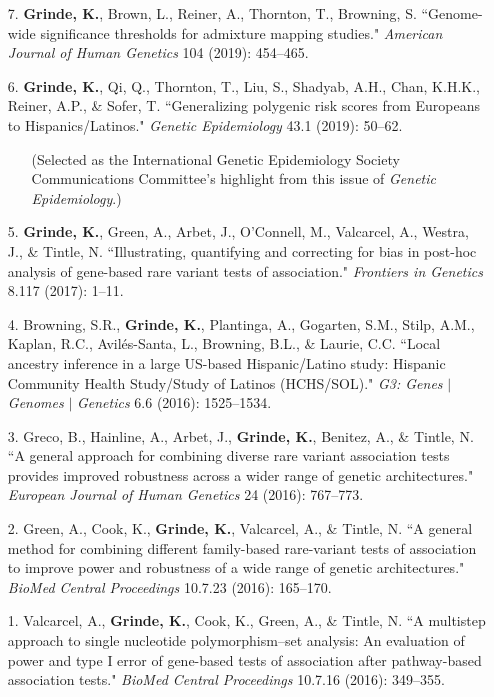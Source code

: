 \documentclass[margin]{res}
\begin{document}
\begin{resume}
\begin{itemize}
\item[7.] \textbf{Grinde, K.}, Brown, L., Reiner, A., Thornton, T., Browning, S. ``Genome-wide significance thresholds for admixture mapping studies." \textit{American Journal of Human Genetics} 104 (2019): 454--465. 

\item[6.] \textbf{Grinde, K.}, Qi, Q., Thornton, T., Liu, S., Shadyab, A.H., Chan, K.H.K., Reiner, A.P., \& Sofer, T. ``Generalizing polygenic risk scores from Europeans to Hispanics/Latinos." \textit{Genetic Epidemiology} 43.1 (2019): 50--62. 
	\begin{itemize} \itemsep -2pt
	\item[] (Selected as the International Genetic Epidemiology Society Communications Committee's highlight from this issue of \textit{Genetic Epidemiology}.)
	\end{itemize}
 
\item[5.] \textbf{Grinde, K.}, Green, A., Arbet, J., O'Connell, M., Valcarcel, A., Westra, J., \& Tintle, N. ``Illustrating, quantifying and correcting for bias in post-hoc analysis of gene-based rare variant tests of association." \textit{Frontiers in Genetics} 8.117 (2017): 1--11. 

\item[4.] Browning, S.R., \textbf{Grinde, K.}, Plantinga, A., Gogarten, S.M., Stilp, A.M., Kaplan, R.C., Avil\'es-Santa, L., Browning, B.L., \& Laurie, C.C. ``Local ancestry inference in a large US-based Hispanic/Latino study: Hispanic Community Health Study/Study of Latinos (HCHS/SOL)." \textit{G3: Genes} $|$ \textit{Genomes} $|$ \textit{Genetics} 6.6 (2016): 1525--1534.

\item[3.] Greco, B., Hainline, A., Arbet, J., \textbf{Grinde, K.}, Benitez, A., \& Tintle, N. ``A general approach for combining diverse rare variant association tests provides improved robustness across a wider range of genetic architectures." \textit{European Journal of Human Genetics} 24 (2016): 767--773.

\item[2.] Green, A., Cook, K., \textbf{Grinde, K.}, Valcarcel, A., \& Tintle, N. ``A general method for combining different family-based rare-variant tests of association to improve power and robustness of a wide range of genetic architectures." \textit{BioMed Central Proceedings} 10.7.23 (2016): 165--170.

\item[1.] Valcarcel, A., \textbf{Grinde, K.}, Cook, K., Green, A., \& Tintle, N. ``A multistep approach to single nucleotide polymorphism--set analysis: An evaluation of power and type I error of gene-based tests of association after pathway-based association tests." \textit{BioMed Central Proceedings} 10.7.16 (2016): 349--355. \\
\end{itemize}


\end{resume}
\end{document}
